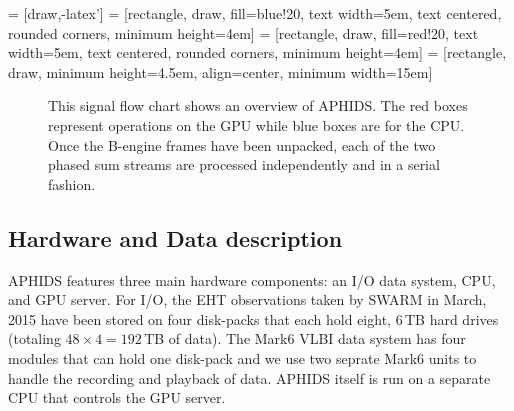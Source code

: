 \documentclass[11pt,preprint]{aastex}
\begin{document}
 = [draw,-latex']
 = [rectangle, draw, fill=blue!20,
    text width=5em, text centered, rounded corners, minimum height=4em]
 = [rectangle, draw, fill=red!20,
    text width=5em, text centered, rounded corners, minimum height=4em]
 = [rectangle, draw, minimum height=4.5em, align=center, minimum width=15em] 

\begin{figure}[H]
\begin{center}
\label{fig:aphids_flow_chart}
\caption{This signal flow chart shows an overview of APHIDS.  The red boxes represent operations on the GPU 
while blue boxes are for the CPU.  Once the B-engine frames have been unpacked, each of the two phased sum 
streams are processed independently and in a serial fashion.}
\end{center}
\end{figure}

\subsection{Hardware and Data description}

APHIDS features three main hardware components: an I/O data system, CPU, and GPU server.  For I/O, the 
EHT observations taken by SWARM in March, 2015 have been stored on four disk-packs that each hold eight, 
6\,TB hard drives (totaling $48 \times 4 = 192$\,TB of data).  The Mark6 VLBI data system has four modules that 
can hold one disk-pack and we use
two seprate Mark6 units to handle the recording and playback of data.  APHIDS itself is run on a separate CPU 
that controls the GPU server.
\end{document}
